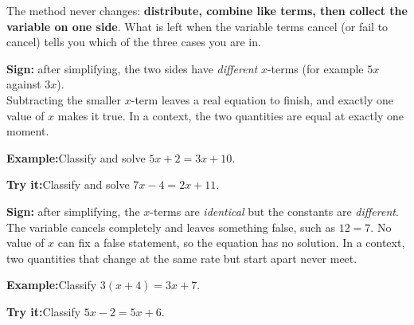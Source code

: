 \documentclass[12pt]{article}
\begin{document}

\noindent\small The method never changes: \textbf{distribute, combine like terms, then
collect the variable on one side}. What is left when the variable terms cancel (or fail
to cancel) tells you which of the three cases you are in.\normalsize

\begin{formulabox}\textbf{Sign:} after simplifying, the two sides have \emph{different}
$x$-terms (for example $5x$ against $3x$).\\[3pt]
Subtracting the smaller $x$-term leaves a real equation to finish, and exactly one value
of $x$ makes it true. In a context, the two quantities are equal at exactly one moment.
\end{formulabox}
\begin{examplebox}\textbf{Example:}\quad Classify and solve $5x + 2 = 3x + 10$.
\end{examplebox}
\begin{tryitbox}\textbf{Try it:}\quad Classify and solve $7x - 4 = 2x + 11$.\\[2pt]
\end{tryitbox}

\begin{formulabox}\textbf{Sign:} after simplifying, the $x$-terms are \emph{identical} but the
constants are \emph{different}.\\[3pt]
The variable cancels completely and leaves something false, such as $12 = 7$. No value of
$x$ can fix a false statement, so the equation has no solution. In a context, two
quantities that change at the same rate but start apart never meet.
\end{formulabox}
\begin{examplebox}\textbf{Example:}\quad Classify $3(x + 4) = 3x + 7$.
\end{examplebox}
\begin{tryitbox}\textbf{Try it:}\quad Classify $5x - 2 = 5x + 6$.\\[2pt]
\end{tryitbox}
\end{document}
